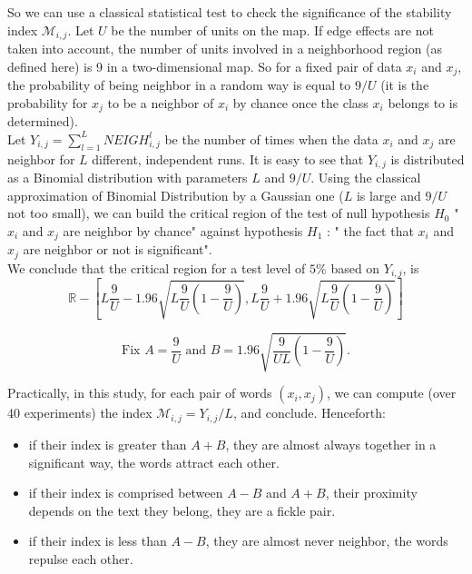 \documentclass{elsarticle}
\begin{document}
So we can use a classical statistical test to check the significance of the stability index $\mathcal{M}_{i,j}$. Let $U$ be the number of units on the map. If edge effects are not taken into account, the number of units involved in a neighborhood region (as defined here) is 9 in a two-dimensional map. So for a fixed pair of data $x_i$ and $x_j$, the probability of being neighbor in a random way is equal to $9/U$ (it is the probability for $x_j$ to be a neighbor of $x_i$ by chance once the class $x_i$ belongs to is determined).\\

Let $Y_{i,j}= \sum_{l=1}^L NEIGH_{i,j}^l$ be the number of times when the data $x_i$ and $x_j$ are neighbor for $L$ different, independent runs. It is easy to see that $Y_{i,j}$ is distributed as a Binomial distribution with parameters $L$ and $9/U$. Using the classical approximation of Binomial Distribution by a Gaussian one ($L$ is large and $9/U$ not too small), we can build the critical region of the test of null hypothesis $H_0$ "$x_i$ and $x_j$ are neighbor by chance" against hypothesis $H_1$ : " the fact that $x_i$ and $x_j$ are neighbor or not is significant".\\

We conclude that the critical region for a test level of $5\%$ based on $Y_{i,j}$, is 
\begin{equation*} 
\mathbb{R} - [ L \frac{9}{U} - 1.96 \sqrt{L \frac{9}{U} ( 1 - \frac{9}{U})}, L \frac{9}{U} + 1.96 \sqrt{L \frac{9}{U} ( 1 - \frac{9}{U}) } ] 
\end{equation*}
 
\begin{equation}\label{AB}
\text {Fix } A = \frac{9}{U} \text{ and } B = 1.96 \sqrt{\frac{9}{UL} ( 1 - \frac{9}{U})}.
\end{equation}

Practically, in this study, for each pair of words $(x_i,x_j)$, we can compute (over 40 experiments) the index $\mathcal{M}_{i,j} = Y_{i,j}/L$, and conclude. Henceforth:\\
 
\begin{itemize}
\item if their index is greater than $A + B$, they are almost always together in a significant way, the words attract each other.
\item if their index is comprised between $A - B$ and $A+B$, their proximity depends on the text they belong, they are a fickle pair.
\item if their index is less than $A - B$, they are almost never neighbor, the words repulse each other.
\end{itemize}
\end{document}

